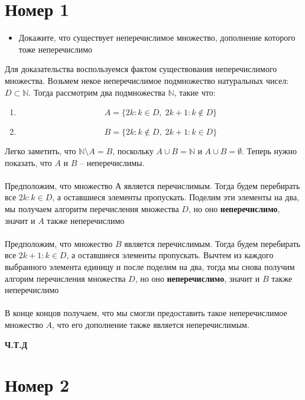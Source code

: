 \documentclass[a4paper,12pt]{article}
\author{Бурмашев Григорий, БПМИ-208}
\title{}
\date{\today}
\begin{document}
\maketitle
\clearpage
\section*{Номер 1}
\begin{itemize}
\item
Докажите, что существует неперечислимое множество, дополнение которого тоже неперечислимо
\end{itemize}
Для доказательства воспользуемся фактом существования неперечислимого множества. Возьмем некое неперечислимое подмножество натуральных чисел: $D \subset \mathbb{N}$. Тогда рассмотрим два подмножества $\mathbb{N}$, такие что:
\begin{enumerate}
\item 
\[
A = \{ 
2k : k \in D, \; 2k + 1 : k \not \in  D
\}
\]
\item 
\[
B = \{
2k : k \not \in D, \; 2k + 1: k \in D 
\}
\]
\end{enumerate}
Легко заметить, что $\mathbb{N} \setminus A = B$, поскольку $A \cup B = \mathbb{N}$ и $A \cup B = \emptyset$. Теперь нужно показать, что $A$ и $B$ -- неперечислимы.
\\\\
Предположим, что множество $А$ является перечислимым. Тогда будем перебирать все $2k : k \in D$, а оставшиеся элементы пропускать. Поделим эти элементы на два, мы получаем алгоритм перечисления множества $D$,  но оно \textbf{неперечислимо}, значит и $A$ также неперечислимо
\\\\
Предположим, что множество $B$ является перечислимым. Тогда будем перебирать все $2k + 1 : k \in D$, а оставшиеся элементы пропускать. Вычтем из каждого выбранного элемента единицу и после поделим на два, тогда мы снова получим алгорим перечисления множества $D$, но оно \textbf{неперечислимо}, значит и $B$ также неперечислимо
\\\\
В конце концов получаем, что мы смогли предоставить такое неперечислимое множество $A$, что его дополнение также является неперечислимым.
\begin{center}
\textbf{Ч.Т.Д} 
\end{center}
\clearpage
\section*{Номер 2}
\end{document}
